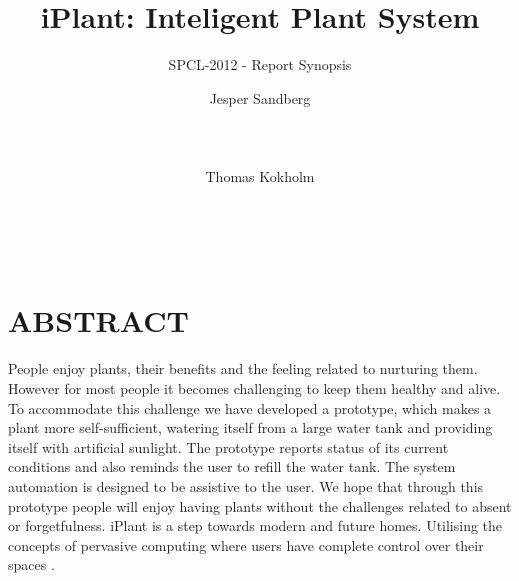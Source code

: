 \documentclass{ubicomp2012}
\begin{document}
\setlength{\paperheight}{11in}
\setlength{\paperwidth}{8.5in}
\setlength{\pdfpageheight}{\paperheight}
\setlength{\pdfpagewidth}{\paperwidth}


\title{iPlant: Inteligent Plant System}
\subtitle{SPCL-2012 - Report Synopsis}
\author{
  \alignauthor Jesper Sandberg\\
    \\
    \\
    \\
 \alignauthor Thomas Kokholm\\
    \\
    \\
    \\
      }
\maketitle

\section{ABSTRACT}
People enjoy plants, their benefits and the feeling related to nurturing them. However for most people it becomes challenging to keep them healthy and alive. To accommodate this challenge we have developed a prototype, which makes a plant more self-sufficient, watering itself from a large water tank and providing itself with artificial sunlight.
The prototype reports status of its current conditions and also reminds the user to refill the water tank. The system automation is designed to be assistive to the user. We hope that through this prototype people will enjoy having plants without the challenges related to absent or forgetfulness.
iPlant is a step towards modern and future homes. Utilising the concepts of pervasive computing where users have complete control over their spaces  \cite{future-homes}.
\end{document}
